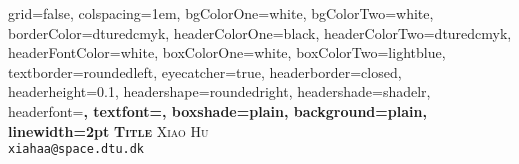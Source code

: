 \documentclass[portrait,final,a0paper,fontscale=0.277]{baposter}
\begin{document}
\begin{poster}%
  {
  grid=false,
  colspacing=1em,
  bgColorOne=white,
  bgColorTwo=white,
  borderColor=dturedcmyk,
  headerColorOne=black,
  headerColorTwo=dturedcmyk,
  headerFontColor=white,
  boxColorOne=white,
  boxColorTwo=lightblue,
  textborder=roundedleft,
  eyecatcher=true,
  headerborder=closed,
  headerheight=0.1\textheight,
  headershape=roundedright,
  headershade=shadelr,
  headerfont=\Large\bf\textsc, %
  textfont={\setlength{\parindent}{1.5em}},
  boxshade=plain,
  background=plain,
  linewidth=2pt
  }
  {} 
  {\bf\textsc{Title}\vspace{0.0em}}
  {\textsc{Xiao Hu}\\[0.3em]
 	{\texttt{xiahaa@space.dtu.dk}}}
  {%
  }

    \newcommand{\colouredcircle}{%
      \tikz{\useasboundingbox (-0.2em,-0.32em) rectangle(0.2em,0.32em); \draw[draw=black,fill=lightblue,line width=0.03em] (0,0) circle(0.18em);}}

\end{poster}
\end{document}
